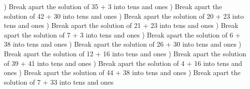 \documentclass{article}%
\begin{document}
\newline%
\newline%
) Break apart the solution of 35 + 3 into tens and ones%
\newline%
\newline%
) Break apart the solution of 42 + 30 into tens and ones%
\newline%
\newline%
) Break apart the solution of 20 + 23 into tens and ones%
\newline%
\newline%
) Break apart the solution of 21 + 23 into tens and ones%
\newline%
\newline%
) Break apart the solution of 7 + 3 into tens and ones%
\newline%
\newline%
) Break apart the solution of 6 + 38 into tens and ones%
\newline%
\newline%
) Break apart the solution of 26 + 30 into tens and ones%
\newline%
\newline%
) Break apart the solution of 12 + 16 into tens and ones%
\newline%
\newline%
) Break apart the solution of 39 + 41 into tens and ones%
\newline%
\newline%
) Break apart the solution of 4 + 16 into tens and ones%
\newline%
\newline%
) Break apart the solution of 44 + 38 into tens and ones%
\newline%
\newline%
) Break apart the solution of 7 + 33 into tens and ones%
\newline%
\newline%
\end{document}
